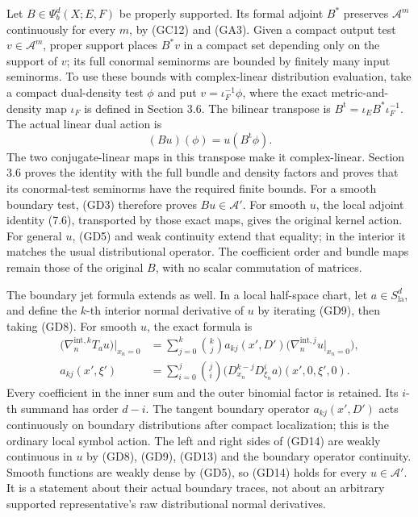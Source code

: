 \documentclass[
  11pt,
]{article}
\begin{document}
Let \(B\in\Psi_b^d(X;E,F)\) be properly supported. Its formal adjoint
\(B^*\) preserves \(\mathcal A^m\) continuously for every \(m\), by
(GC12) and (GA3). Given a compact output test \(v\in\mathcal A^m\),
proper support places \(B^*v\) in a compact set depending only on the
support of \(v\); its full conormal seminorms are bounded by finitely
many input seminorms. To use these bounds with complex-linear
distribution evaluation, take a compact dual-density test \(\phi\) and
put \(v=\iota_F^{-1}\phi\), where the exact metric-and-density map
\(\iota_F\) is defined in Section 3.6. The bilinear transpose is
\(B^{\mathrm t}=\iota_E B^*\iota_F^{-1}\). The actual linear dual action
is \[
 (Bu)(\phi)=u(B^{\mathrm t}\phi).
 \tag{GD13}
\] The two conjugate-linear maps in this transpose make it
complex-linear. Section 3.6 proves the identity with the full bundle and
density factors and proves that its conormal-test seminorms have the
required finite bounds. For a smooth boundary test, (GD3) therefore
proves \(Bu\in\mathcal A'\). For smooth \(u\), the local adjoint
identity (7.6), transported by those exact maps, gives the original
kernel action. For general \(u\), (GD5) and weak continuity extend that
equality; in the interior it matches the usual distributional operator.
The coefficient order and bundle maps remain those of the original
\(B\), with no scalar commutation of matrices.

The boundary jet formula extends as well. In a local half-space chart,
let \(a\in S^d_{\mathrm{la}}\), and define the \(k\)-th interior normal
derivative of \(u\) by iterating (GD9), then taking (GD8). For smooth
\(u\), the exact formula is \[
 \begin{aligned}
 \bigl(\nabla_n^{\mathrm{int},k}T_au\bigr)|_{x_n=0}
   &=\sum_{j=0}^k\binom{k}{j}
       a_{kj}(x',D')
       \bigl(\nabla_n^{\mathrm{int},j}u|_{x_n=0}\bigr),\\
 a_{kj}(x',\xi')
   &=\sum_{i=0}^j\binom{j}{i}
       \bigl(D_{x_n}^{k-j}D_{\xi_n}^{i}a\bigr)
                   (x',0,\xi',0).
 \end{aligned}
 \tag{GD14}
\] Every coefficient in the inner sum and the outer binomial factor is
retained. Its \(i\)-th summand has order \(d-i\). The tangent boundary
operator \(a_{kj}(x',D')\) acts continuously on boundary distributions
after compact localization; this is the ordinary local symbol action.
The left and right sides of (GD14) are weakly continuous in \(u\) by
(GD8), (GD9), (GD13) and the boundary operator continuity. Smooth
functions are weakly dense by (GD5), so (GD14) holds for every
\(u\in\mathcal A'\). It is a statement about their actual boundary
traces, not about an arbitrary supported representative's raw
distributional normal derivatives.
\end{document}
